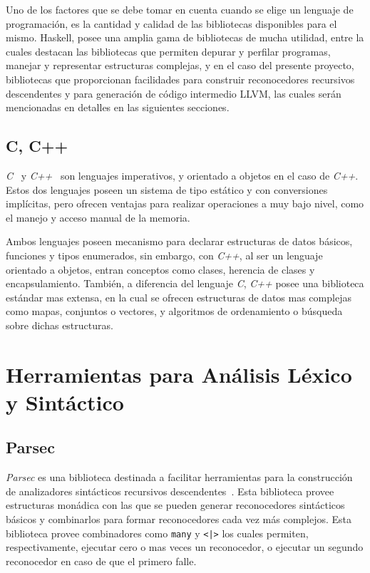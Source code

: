 Uno de los factores que se debe tomar en cuenta cuando se elige un lenguaje de
programación, es la cantidad y calidad de las bibliotecas disponibles para el
mismo. Haskell, posee una amplia gama de bibliotecas de mucha utilidad, entre la
cuales destacan las bibliotecas que permiten depurar y perfilar programas,
manejar y representar estructuras complejas, y en el caso del presente
proyecto, bibliotecas que proporcionan facilidades para construir reconocedores
recursivos descendentes y para generación de código intermedio LLVM, las
cuales serán mencionadas en detalles en las siguientes secciones.


\subsection{C, C++}

\textit{C}~\cite{c-lang} y \textit{C++}~\cite{cpp-lang} son lenguajes
imperativos, y orientado a objetos en el caso de \textit{C++}. Estos dos
lenguajes poseen un sistema de tipo estático y con conversiones implícitas, pero
ofrecen ventajas para realizar operaciones a muy bajo nivel, como el manejo y
acceso manual de la memoria.

Ambos lenguajes poseen mecanismo para declarar estructuras de datos básicos,
funciones y tipos enumerados, sin embargo, con \textit{C++}, al ser un lenguaje
orientado a objetos, entran conceptos como clases, herencia de clases y
encapsulamiento. También, a diferencia del lenguaje \textit{C}, \textit{C++}
posee una biblioteca estándar mas extensa, en la cual se ofrecen estructuras de
datos mas complejas como mapas, conjuntos o vectores, y algoritmos de
ordenamiento o búsqueda sobre dichas estructuras.

\section{Herramientas para Análisis Léxico y Sintáctico}

\subsection{Parsec}

\textit{Parsec} es una biblioteca destinada a facilitar herramientas para la
construcción de analizadores sintácticos recursivos descendentes~\cite{parsec}.
Esta biblioteca provee estructuras monádica con las que se pueden generar
reconocedores sintácticos básicos y combinarlos para formar reconocedores cada
vez más complejos.  Esta biblioteca provee combinadores como \texttt{many} y
\texttt{<|>} los cuales permiten, respectivamente, ejecutar cero o mas veces un
reconocedor, o ejecutar un segundo reconocedor en caso de que el primero falle.

